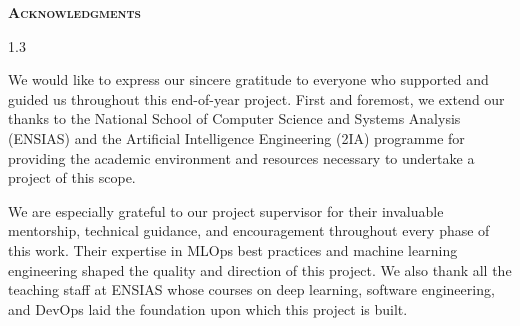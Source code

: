 \begin{center}
\vspace*{3cm}
\textsc{\huge \bfseries Acknowledgments}\\[1cm]
\end{center}

\begin{spacing}{1.3}

We would like to express our sincere gratitude to everyone who supported and guided us throughout this end-of-year project. First and foremost, we extend our thanks to the National School of Computer Science and Systems Analysis (ENSIAS) and the Artificial Intelligence Engineering (2IA) programme for providing the academic environment and resources necessary to undertake a project of this scope.

We are especially grateful to our project supervisor for their invaluable mentorship, technical guidance, and encouragement throughout every phase of this work. Their expertise in MLOps best practices and machine learning engineering shaped the quality and direction of this project. We also thank all the teaching staff at ENSIAS whose courses on deep learning, software engineering, and DevOps laid the foundation upon which this project is built.

\end{spacing}
